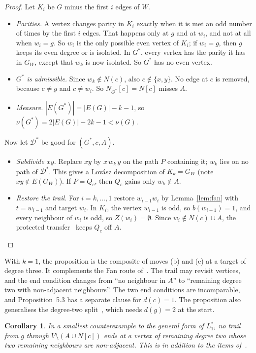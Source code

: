 \documentclass[11pt]{amsart}
\newtheorem{corollary}[theorem]{Corollary}
\theoremstyle{definition}
\newcommand{\cD}{\mathcal D}
\begin{document}
\begin{proof}
Let $K_i$ be $G$ minus the first $i$ edges of $W$.
\begin{itemize}
\item \emph{Parities.} A vertex changes parity in $K_i$ exactly when it is met an odd number of times
by the first $i$ edges. That happens only at $g$ and at $w_i$, and not at all when $w_i=g$. So $w_i$
is the only possible even vertex of $K_i$; if $w_i=g$, then $g$ keeps its even degree or is
isolated. In $G^*$, every vertex has the parity it has in $G_W$, except
that $w_k$ is now isolated. So $G^*$ has no even vertex.
\item \emph{$G^*$ is admissible.} Since $w_k\notin N(c)$, also $c\notin\{x,y\}$. No edge at $c$ is
removed, because $c\ne g$ and $c\ne w_i$. So $N_{G^*}[c]=N[c]$ misses $A$.
\item \emph{Measure.} $|E(G^*)|=|E(G)|-k-1$, so $\nu(G^*)=2|E(G)|-2k-1<\nu(G)$.
\end{itemize}
Now let $\cD^*$ be good for $(G^*,c,A)$.
\begin{itemize}
\item \emph{Subdivide $xy$.} Replace $xy$ by $x\,w_k\,y$ on the path $P$ containing it; $w_k$ lies
on no path of $\cD^*$. This gives a Lov\'asz decomposition of $K_k=G_W$ (note $xy\notin E(G_W)$). If
$P=Q_c$, then $Q_c$ gains only $w_k\notin A$.
\item \emph{Restore the trail.} For $i=k,\dots,1$ restore $w_{i-1}w_i$ by Lemma~\ref{lem:fan} with
$t=w_{i-1}$ and target $w_i$. In $K_i$, the vertex $w_{i-1}$ is odd, so $b(w_{i-1})=1$, and every
neighbour of $w_i$ is odd, so $Z(w_i)=\emptyset$. Since $w_i\notin N(c)\cup A$, the protected
transfer~\cite[Lemma~2.4]{L1S} keeps $Q_c$ off $A$.
\end{itemize}
\end{proof}

With $k=1$, the proposition is the composite of moves (b) and (e) at a target of degree three. It
complements the Fan route of~\cite[Prop.~5.3]{L1S}. The trail may revisit vertices, and the end
condition changes from ``no neighbour in $A$'' to ``remaining degree two with non-adjacent
neighbours''. The two end conditions are incomparable, and Proposition~5.3 has a separate clause for
$d(c)=1$. The proposition also generalises the degree-two split~\cite[Prop.~5.4(i)]{L1S}, which needs
$d(g)=2$ at the start.

\begin{corollary}\label{cor:mincex}
In a smallest counterexample to the general form of $L_1^*$, no trail from $g$ through
$V\setminus(A\cup N[c])$ ends at a vertex of remaining degree two whose two remaining neighbours are
non-adjacent. This is in addition to the items of~\cite[Corollary~5.6]{L1S}.
\end{corollary}
\end{document}
